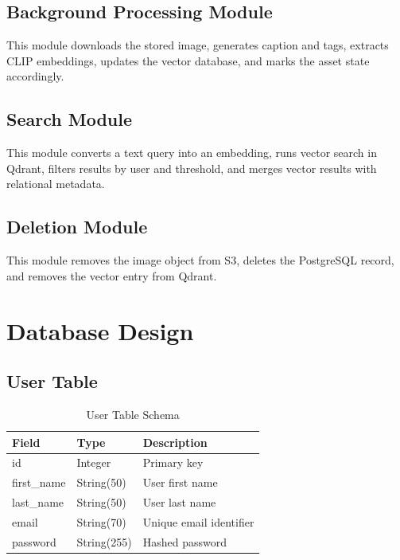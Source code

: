 \documentclass[12pt,a4paper]{report}
\begin{document}
\subsection{Background Processing Module}
This module downloads the stored image, generates caption and tags, extracts CLIP embeddings, updates the vector database, and marks the asset state accordingly.

\subsection{Search Module}
This module converts a text query into an embedding, runs vector search in Qdrant, filters results by user and threshold, and merges vector results with relational metadata.

\subsection{Deletion Module}
This module removes the image object from S3, deletes the PostgreSQL record, and removes the vector entry from Qdrant.

\section{Database Design}
\subsection{User Table}
\begin{table}[H]
\centering
\caption{User Table Schema}
\begin{tabularx}{\textwidth}{|l|l|X|}
\hline
\textbf{Field} & \textbf{Type} & \textbf{Description} \\
\hline
id & Integer & Primary key \\
\hline
first\_name & String(50) & User first name \\
\hline
last\_name & String(50) & User last name \\
\hline
email & String(70) & Unique email identifier \\
\hline
password & String(255) & Hashed password \\
\hline
\end{tabularx}
\end{table}
\end{document}
